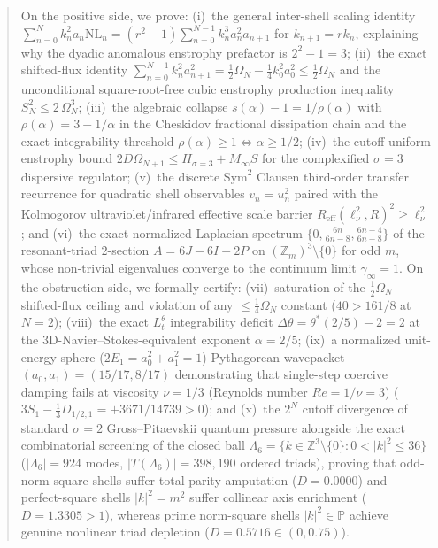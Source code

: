 \documentclass[11pt,a4paper]{article}
\theoremstyle{definition}
\theoremstyle{remark}
\begin{document}
\begin{abstract}
On the positive side, we prove: (i)~the general inter-shell scaling identity $\sum_{n=0}^N k_n^2 a_n \mathrm{NL}_n = \mbox{$(r^2-1)$}\sum_{n=0}^{N-1} k_n^3 a_n^2 a_{n+1}$ for $k_{n+1} = r k_n$, explaining why the dyadic anomalous enstrophy prefactor is $2^2-1=3$; (ii)~the exact shifted-flux identity $\sum_{n=0}^{N-1} k_n^2 a_{n+1}^2 = \frac{1}{2}\Omega_N - \frac{1}{4}k_0^2 a_0^2 \le \frac{1}{2}\Omega_N$ and the unconditional square-root-free cubic enstrophy production inequality $S_N^2 \le 2\,\Omega_N^3$; (iii)~the algebraic collapse $s(\alpha)-1 = 1/\rho(\alpha)$ with $\rho(\alpha)=3-1/\alpha$ in the Cheskidov fractional dissipation chain and the exact integrability threshold $\rho(\alpha) \ge 1 \iff \alpha \ge 1/2$; (iv)~the cutoff-uniform enstrophy bound $2D\Omega_{N+1} \le H_{\sigma=3} + M_\infty S$ for the complexified $\sigma=3$ dispersive regulator; (v)~the discrete $\mathrm{Sym}^2$ Clausen third-order transfer recurrence for quadratic shell observables $v_n = u_n^2$ paired with the Kolmogorov ultraviolet/infrared effective scale barrier $R_{\mathrm{eff}}(\ell_\nu^2, R)^2 \ge \ell_\nu^2$; and (vi)~the exact normalized Laplacian spectrum $\{0, \frac{6n}{6n-8}, \frac{6n-4}{6n-8}\}$ of the resonant-triad $2$-section $A = 6J - 6I - 2P$ on $(\mathbb{Z}_m)^3 \setminus \{0\}$ for odd $m$, whose non-trivial eigenvalues converge to the continuum limit $\gamma_\infty = 1$. On the obstruction side, we formally certify: (vii)~saturation of the $\frac{1}{2}\Omega_N$ shifted-flux ceiling and violation of any $\le \frac{1}{4}\Omega_N$ constant ($40 > 161/8$ at $N=2$); (viii)~the exact $L^\theta_t$ integrability deficit $\Delta\theta = \theta^*(2/5)-2 = 2$ at the 3D-Navier--Stokes-equivalent exponent $\alpha=2/5$; (ix)~a normalized unit-energy sphere ($2E_1 = a_0^2+a_1^2 = 1$) Pythagorean wavepacket $(a_0,a_1)=(15/17, 8/17)$ demonstrating that single-step coercive damping fails at viscosity $\nu = 1/3$ (Reynolds number $Re = 1/\nu = 3$) ($3S_1 - \frac{1}{3}D_{1/2,1} = +3671/14739 > 0$); and (x)~the $2^N$ cutoff divergence of standard $\sigma=2$ Gross--Pitaevskii quantum pressure alongside the exact combinatorial screening of the closed ball $\Lambda_6 = \{k \in \mathbb{Z}^3 \setminus \{0\} : 0 < |k|^2 \le 36\}$ ($|\Lambda_6|=924$ modes, $|T(\Lambda_6)|=398{,}190$ ordered triads), proving that odd-norm-square shells suffer total parity amputation ($D=0.0000$) and perfect-square shells $|k|^2=m^2$ suffer collinear axis enrichment ($D=1.3305 > 1$), whereas prime norm-square shells $|k|^2 \in \mathbb{P}$ achieve genuine nonlinear triad depletion ($D = 0.5716 \in (0, 0.75)$).
\end{abstract}
\end{document}
